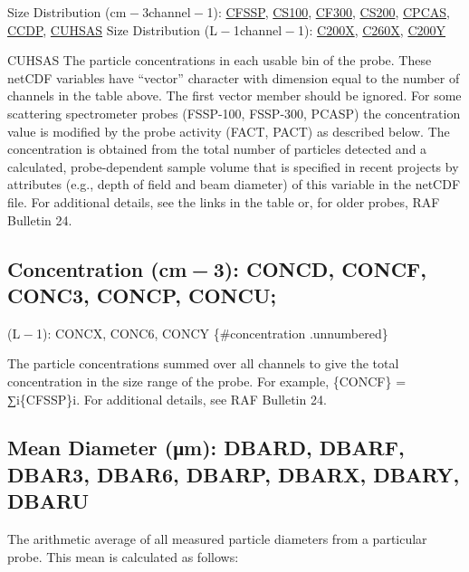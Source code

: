 \documentclass[
  english,
]{book}
\begin{document}
Size Distribution ({cm − 3}channel{ − 1}): \underline{CFSSP}, \underline{CS100}, \underline{CF300}, \underline{CS200}, \underline{CPCAS}, \underline{CCDP}, \underline{CUHSAS}
Size Distribution (L{ − 1}channel{ − 1}): \underline{C200X}, \underline{C260X}, \underline{C200Y}

\protect\hypertarget{CUHSAS}{}{CUHSAS}
The particle concentrations in each usable bin of the probe. These netCDF variables have ``vector'' character with dimension equal to the number of channels in the table above. The first vector member should be ignored. For some scattering spectrometer probes (FSSP-100, FSSP-300, PCASP) the concentration value is modified by the probe activity (FACT, PACT) as described below. The concentration is obtained from the total number of particles detected and a calculated, probe-dependent sample volume that is specified in recent projects by attributes (e.g., depth of field and beam diameter) of this variable in the netCDF file. For additional details, see the links in the table or, for older probes, RAF Bulletin 24.

\hypertarget{concentration-cm-3-concd-concf-conc3-concp-concu}{%
\subsection{\texorpdfstring{Concentration (cm{ − 3}): CONCD, CONCF, CONC3, CONCP, CONCU;}{Concentration (cm − 3): CONCD, CONCF, CONC3, CONCP, CONCU;}}\label{concentration-cm-3-concd-concf-conc3-concp-concu}}

(L{ − 1}): CONCX, CONC6, CONCY \{\#concentration .unnumbered\}

The particle concentrations summed over all channels to give the total concentration in the size range of the probe. For example, \{CONCF\} = {∑i\{CFSSP\}i}. For additional details, see RAF Bulletin 24.

\hypertarget{mean-diameter}{%
\subsection*{\texorpdfstring{Mean Diameter ({μ}m): DBARD, DBARF, DBAR3, DBAR6, DBARP, DBARX, DBARY, DBARU}{Mean Diameter (μm): DBARD, DBARF, DBAR3, DBAR6, DBARP, DBARX, DBARY, DBARU}}\label{mean-diameter}}

The arithmetic average of all measured particle diameters from a particular probe. This mean is calculated as follows:
\end{document}
